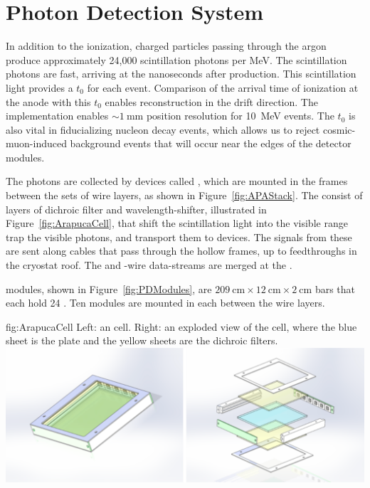\section{Photon Detection System}
\label{sec:fdsp-exec-pds}

In addition to the ionization, charged particles passing through the argon produce approximately 24,000 scintillation photons per \si{\mega\electronvolt}. The scintillation photons are fast, arriving at the  nanoseconds after production. This scintillation light provides a $t_{0}$ for each event. Comparison of the arrival time of ionization at the anode with this $t_{0}$ enables reconstruction in the drift direction. 
The  implementation enables $\sim\!\SI{1}{\mm}$ position resolution for \SI{10}{\mega\electronvolt}  events. The  $t_{0}$ is also vital in fiducializing nucleon decay events, which allows us to reject cosmic-muon-induced background events that will occur near the edges of the detector modules.

The photons are collected by devices called , which are mounted in the  frames between the sets of wire layers, as shown in Figure~\ref{fig:APAStack}. 
The  %
consist of layers of dichroic filter and wavelength-shifter, illustrated in Figure~\ref{fig:ArapucaCell}, that shift the  scintillation light into the visible range  trap  the visible photons, %
and transport them to  devices. The signals from these  are sent along cables that pass through the hollow  frames, up to feedthroughs in the cryostat roof. The  and -wire data-streams are merged at the . 

 modules, shown in Figure~\ref{fig:PDModules}, are 
$\SI{209}{\cm}\times\SI{12}{\cm}\times\SI{2}{\cm}$ bars that each hold 24 . 
Ten   modules  are mounted in each  between the wire layers. 

\begin{dunefigure}{fig:ArapucaCell}
{Left: an  cell. Right: an exploded view of the  cell, where the blue sheet is the  plate and the yellow sheets are the dichroic filters.}
\includegraphics[width=\textwidth]{graphics/XArapuca.pdf}
\end{dunefigure}

